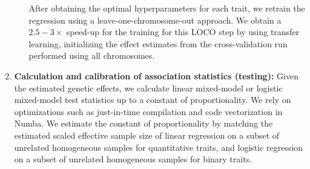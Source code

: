 \begin{enumerate}
\begin{enumerate}
        After obtaining the optimal hyperparameters for each trait, we retrain the regression using a leave-one-chromosome-out approach.
        We obtain a $2.5-3 \times$ speed-up for the training for this LOCO step by using transfer learning, initializing the effect estimates from the cross-validation run performed using all chromosomes.
    \end{enumerate}
    \item \textbf{Calculation and calibration of association statistics (testing):}
    Given the estimated genetic effects, we calculate linear mixed-model or logistic mixed-model test statistics up to a constant of proportionality.
    We rely on optimizations such as just-in-time compilation and code vectorization in Numba.
    We estimate the constant of proportionality by matching the estimated scaled effective sample size of linear regression on a subset of unrelated homogeneous samples for quantitative traits, and logistic regression on a subset of unrelated homogeneous samples for binary traits.
\end{enumerate}